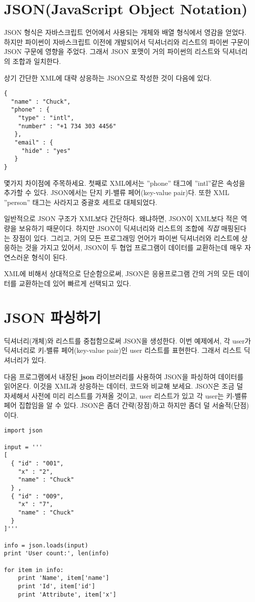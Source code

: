 \section{JSON(JavaScript Object Notation)}

JSON 형식은 자바스크립트 언어에서 사용되는 개체와 배열 형식에서 영감을 얻었다.
하지만 파이썬이 자바스크립트 이전에 개발되어서 딕셔너리와 리스트의 파이썬 구문이 JSON 구문에 영향을 주었다.
그래서 JSON 포맷이 거의 파이썬의 리스트와 딕셔너리의 조합과 일치한다. 

상기 간단한 XML에 대략 상응하는 JSON으로 작성한 것이 다음에 있다.

\beforeverb
\begin{verbatim}
{
  "name" : "Chuck",
  "phone" : {
    "type" : "intl",
    "number" : "+1 734 303 4456"
   },
   "email" : {
     "hide" : "yes"
   }
}
\end{verbatim}
\afterverb
%

몇가지 차이점에 주목하세요. 첫째로 XML에서는 ''phone'' 태그에 ''intl''같은 속성을 추가할 수 있다.
JSON에서는 단지 키-밸류 페어(key-value pair)다. 또한 XML ''person'' 태그는 사라지고 중괄호 세트로 대체되었다.

일반적으로 JSON 구조가 XML보다 간단하다. 왜냐하면, JSON이 XML보다 적은 역량을 보유하기 때문이다.
하지만 JSON이 딕셔너리와 리스트의 조합에 {\em 직접} 매핑된다는 장점이 있다.
그리고, 거의 모든 프로그래밍 언어가 파이썬 딕셔너러와 리스트에 상응하는 것을 가지고 있어서,
JSON이 두 협업 프로그램이 데이터를 교환하는데 매우 자연스러운 형식이 된다.

XML에 비해서 상대적으로 단순함으로써, JSON은 응용프로그램 간의 거의 모든 데이터를 교환하는데 있어
빠르게 선택되고 있다. 

\section{JSON 파싱하기}
딕셔너리(개체)와 리스트를 중첩함으로써 JSON을 생성한다. 이번 예제에서,
각 user가 딕셔너리로 키-밸류 페어(key-value pair)인 user 리스트를 표현한다. 그래서 리스트 딕셔너리가 있다.

다음 프로그램에서 내장된 {\bf json} 라이브러리를 사용하여 JSON을 파싱하여 데이터를 읽어온다.
이것을 XML과 상응하는 데이터, 코드와 비교해 보세요. JSON은 조금 덜 자세해서 사전에 미리 리스트를 가져올 것이고, user 리스트가 있고 각 user는 키-밸류 페어 집합임을 알 수 있다. JSON은 좀더 간략(장점)하고 하지만 
좀더 덜 서술적(단점)이다. 

\beforeverb
\begin{verbatim}
import json

input = '''
[
  { "id" : "001",
    "x" : "2",
    "name" : "Chuck"
  } ,
  { "id" : "009",
    "x" : "7",
    "name" : "Chuck"
  } 
]'''

info = json.loads(input)
print 'User count:', len(info)

for item in info:
    print 'Name', item['name']
    print 'Id', item['id']
    print 'Attribute', item['x']
\end{verbatim}
\afterverb
%

